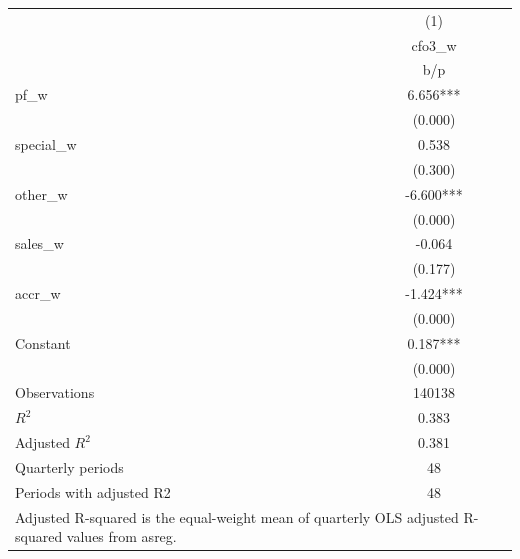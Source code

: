 {
\def\sym#1{\ifmmode^{#1}\else\(^{#1}\)\fi}
\begin{tabular}{l*{1}{c}}
\hline\hline
                    &\multicolumn{1}{c}{(1)}\\
                    &\multicolumn{1}{c}{cfo3\_w}\\
                    &         b/p   \\
\hline
pf\_w                &       6.656***\\
                    &     (0.000)   \\
special\_w           &       0.538   \\
                    &     (0.300)   \\
other\_w             &      -6.600***\\
                    &     (0.000)   \\
sales\_w             &      -0.064   \\
                    &     (0.177)   \\
accr\_w              &      -1.424***\\
                    &     (0.000)   \\
Constant            &       0.187***\\
                    &     (0.000)   \\
\hline
Observations        &      140138   \\
\(R^{2}\)           &       0.383   \\
Adjusted \(R^{2}\)  &       0.381   \\
Quarterly periods   &          48   \\
Periods with adjusted R2&          48   \\
\hline\hline
\multicolumn{2}{l}{\footnotesize Adjusted R-squared is the equal-weight mean of quarterly OLS adjusted R-squared values from asreg.}\\
\end{tabular}
}
